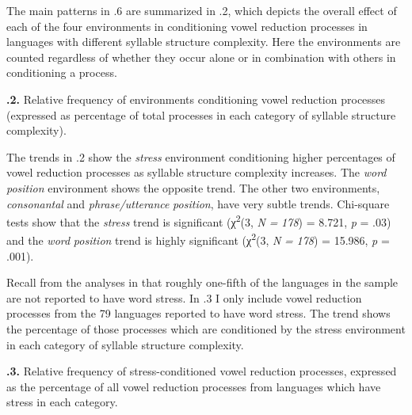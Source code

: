   The main patterns in .6 are summarized in .2, which depicts the overall effect of each of the four environments in conditioning vowel reduction processes in languages with different syllable structure complexity. Here the environments are counted regardless of whether they occur alone or in combination with others in conditioning a process.





\textbf{.2.} Relative frequency of environments conditioning vowel reduction processes (expressed as percentage of total processes in each category of syllable structure complexity).



  The trends in .2 show the \textit{stress} environment conditioning higher percentages of vowel reduction processes as syllable structure complexity increases. The \textit{word} \textit{position} environment shows the opposite trend. The other two environments, \textit{consonantal} and \textit{phrase/utterance} \textit{position}, have very subtle trends. Chi-square tests show that the \textit{stress} trend is significant (χ\textsuperscript{2}(3, \textit{N} \textit{=} \textit{178}) = 8.721, \textit{p} = .03) and the \textit{word} \textit{position} trend is highly significant (χ\textsuperscript{2}(3, \textit{N} \textit{=} \textit{178}) = 15.986, \textit{p} = .001).



  Recall from the analyses in  that roughly one-fifth of the languages in the sample are not reported to have word stress. In .3 I only include vowel reduction processes from the 79 languages reported to have word stress. The trend shows the percentage of those processes which are conditioned by the stress environment in each category of syllable structure complexity.





\textbf{.3.} Relative frequency of stress-conditioned vowel reduction processes, expressed as the percentage of all vowel reduction processes from languages which have stress in each category.



